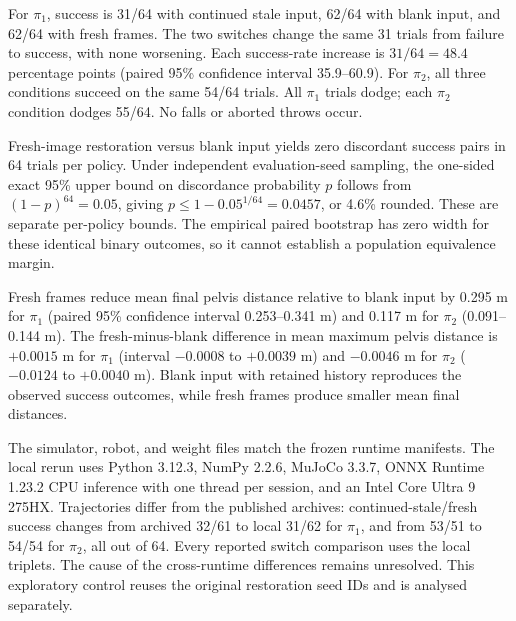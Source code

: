 \begin{table}[t]
\caption{Stale-to-blank control. Counts out of 64; falls and aborted throws are
zero. Mean maximum and final pelvis distances are in metres and include every
trial, including hits. All trials reach four seconds.}
\label{tab:switch}\centering\small

\end{table}
For $\pi_1$, success is 31/64 with continued stale input, 62/64 with blank input,
and 62/64 with fresh frames. The two switches change the same 31 trials from
failure to success, with none worsening. Each success-rate increase is
$31/64=48.4$ percentage points (paired 95\% confidence interval 35.9--60.9).
For $\pi_2$, all three conditions succeed on the same 54/64 trials. All $\pi_1$
trials dodge; each $\pi_2$ condition dodges 55/64. No falls or aborted throws
occur.

Fresh-image restoration versus blank input yields zero discordant success
pairs in 64 trials per policy. Under independent evaluation-seed sampling,
the one-sided exact 95\% upper bound on discordance probability $p$ follows
from $(1-p)^{64}=0.05$, giving $p\leq1-0.05^{1/64}=0.0457$, or 4.6\% rounded.
These are separate per-policy bounds. The empirical paired bootstrap has zero
width for these identical binary outcomes, so it cannot establish a population
equivalence margin.

Fresh frames reduce mean final pelvis distance relative to blank input by
0.295 m for $\pi_1$ (paired 95\% confidence interval 0.253--0.341 m) and
0.117 m for $\pi_2$ (0.091--0.144 m). The fresh-minus-blank difference in mean
maximum pelvis distance is $+0.0015$ m for $\pi_1$ (interval $-0.0008$ to
$+0.0039$ m) and $-0.0046$ m for $\pi_2$ ($-0.0124$ to $+0.0040$ m).
Blank input with retained history reproduces the observed success outcomes,
while fresh frames produce smaller mean final distances.

The simulator, robot, and weight files match the frozen runtime manifests.
The local rerun uses Python 3.12.3, NumPy 2.2.6, MuJoCo 3.3.7, ONNX Runtime
1.23.2 CPU inference with one thread per session, and an Intel Core Ultra
9 275HX. Trajectories differ from the published archives: continued-stale/fresh
success changes from archived 32/61 to local 31/62 for $\pi_1$, and from 53/51
to 54/54 for $\pi_2$, all out of 64. Every reported switch comparison uses the
local triplets. The cause of the cross-runtime differences remains unresolved.
This exploratory control reuses the original restoration seed IDs and is
analysed separately.
